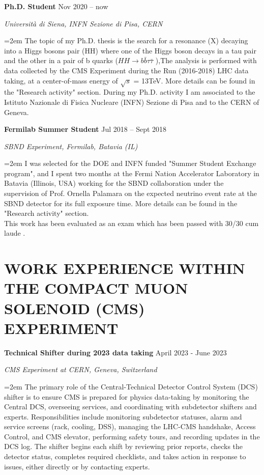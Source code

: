 \documentclass[fontsize=12pt]{article} %
\newcommand{\hhbbtt}{$ HH \rightarrow b\bar{b}\tau\bar{\tau}$ }
\newcommand{\sepspace}{\vspace*{1em}}		%
\newcommand{\NewPart}[1]{\section*{\uppercase{#1}}}
\newcommand{\EducationEntry}[4]{
	\noindent \textbf{#1} \hfill      %
	{#2} \par  %
	\noindent \textit{#3} \par        %
	\noindent\hangindent=2em\hangafter=0 \small #4 %
	\normalsize \par}
\begin{document}
    \sepspace
	\EducationEntry{Ph.D. Student }{Nov 2020 {--} now}{Università di Siena, INFN Sezione di Pisa, CERN}{The topic of my Ph.D. thesis is the search for a resonance (X) decaying into a Higgs bosons pair (HH) where one of the Higgs boson decays in a tau pair and the other in a pair of b quarks (\hhbbtt),The analysis is performed with data collected by the CMS Experiment during the Run\;2 (2016-2018) LHC data taking, at a center-of-mass energy of $\sqrt{s}$ = 13TeV. More details can be found in the "Research activity" section. During my Ph.D. activity I am associated to the Istituto Nazionale di Fisica Nucleare (INFN) Sezione di Pisa and to the CERN of Geneva.}
    \sepspace
	\EducationEntry{Fermilab Summer Student}{Jul 2018 {--} Sept 2018}{SBND Experiment, Fermilab, Batavia (IL)}{I was selected for the DOE and INFN funded "Summer Student Exchange program", and I spent two months at the Fermi Nation Accelerator Laboratory in Batavia (Illinois, USA) working for the SBND collaboration under the supervision of Prof. Ornella Palamara on the expected neutrino event rate at the SBND detector for its full exposure time. More details can be found in the "Research activity" section.\\ \noindent This work has been evaluated as an exam which has been passed with 30/30 cum laude \cite{partecip_fermilab}.}
    \sepspace

	\NewPart{Work Experience within the Compact Muon Solenoid (CMS) experiment}
	\EducationEntry{Technical Shifter during 2023 data taking}{April 2023 - June 2023}{CMS Experiment at CERN, Geneva, Switzerland}{The primary role of the Central-Technical Detector Control System (DCS) shifter is to ensure CMS is prepared for physics data-taking by monitoring the Central DCS, overseeing services, and coordinating with subdetector shifters and experts. Responsibilities include monitoring subdetector statuses, alarm and service screens (rack, cooling, DSS), managing the LHC-CMS handshake, Access Control, and CMS elevator, performing safety tours, and recording updates in the DCS log. The shifter begins each shift by reviewing prior reports, checks the detector status, completes required checklists, and takes action in response to issues, either directly or by contacting experts.}
\end{document}
